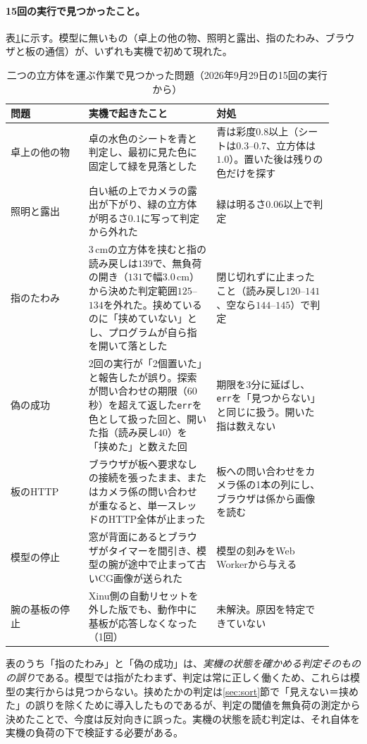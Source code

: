 \documentclass[10pt,letterpaper]{article}
\begin{document}
\paragraph{15回の実行で見つかったこと。}表\ref{tab:sort2}に示す。模型に無いもの（卓上の他の物、照明と露出、指のたわみ、ブラウザと板の通信）が、いずれも実機で初めて現れた。

\begin{table}[h]
\centering\small
\caption{二つの立方体を運ぶ作業で見つかった問題（2026年9月29日の15回の実行から）}
\label{tab:sort2}
\begin{tabular}{p{0.22\linewidth}p{0.36\linewidth}p{0.33\linewidth}}
\toprule
問題 & 実機で起きたこと & 対処 \\
\midrule
卓上の他の物 & 卓の水色のシートを青と判定し、最初に見た色に固定して緑を見落とした & 青は彩度$0.8$以上（シートは$0.3$--$0.7$、立方体は$1.0$）。置いた後は残りの色だけを探す \\
照明と露出 & 白い紙の上でカメラの露出が下がり、緑の立方体が明るさ$0.1$に写って判定から外れた & 緑は明るさ$0.06$以上で判定 \\
指のたわみ & 3\,cmの立方体を挟むと指の読み戻しは$139$で、無負荷の開き（$131$で幅$3.0$\,cm）から決めた判定範囲$125$--$134$を外れた。挟めているのに「挟めていない」とし、プログラムが自ら指を開いて落とした & 閉じ切れずに止まったこと（読み戻し$120$--$141$、空なら$144$--$145$）で判定 \\
偽の成功 & 2回の実行が「2個置いた」と報告したが誤り。探索が問い合わせの期限（60\,秒）を超えて返した\texttt{err}を色として扱った回と、開いた指（読み戻し$40$）を「挟めた」と数えた回 & 期限を3分に延ばし、\texttt{err}を「見つからない」と同じに扱う。開いた指は数えない \\
板のHTTP & ブラウザが板へ要求なしの接続を張ったまま、またはカメラ係の問い合わせが重なると、単一スレッドのHTTP全体が止まった & 板への問い合わせをカメラ係の1本の列にし、ブラウザは係から画像を読む \\
模型の停止 & 窓が背面にあるとブラウザがタイマーを間引き、模型の腕が途中で止まって古いCG画像が送られた & 模型の刻みをWeb Workerから与える \\
腕の基板の停止 & Xinu側の自動リセットを外した版でも、動作中に基板が応答しなくなった（1回） & 未解決。原因を特定できていない \\
\bottomrule
\end{tabular}
\end{table}

表のうち「指のたわみ」と「偽の成功」は、\emph{実機の状態を確かめる判定そのものの誤り}である。模型では指がたわまず、判定は常に正しく働くため、これらは模型の実行からは見つからない。挟めたかの判定は\ref{sec:sort}節で「見えない＝挟めた」の誤りを除くために導入したものであるが、判定の閾値を無負荷の測定から決めたことで、今度は反対向きに誤った。実機の状態を読む判定は、それ自体を実機の負荷の下で検証する必要がある。
\end{document}
